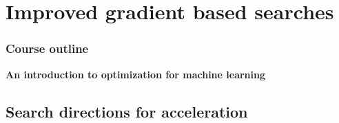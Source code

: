 \documentclass[12pt]{beamer}
\begin{document}
\section{Improved gradient based searches}

\begin{frame}%
\frametitle{Course outline} 
\begin{multicols}{2}
\begin{center} \textbf{An introduction to optimization for machine learning} \end{center}
\tableofcontents[currentsection]
\end{multicols}
\end{frame}

\subsection{Search directions for acceleration}

\end{document}
